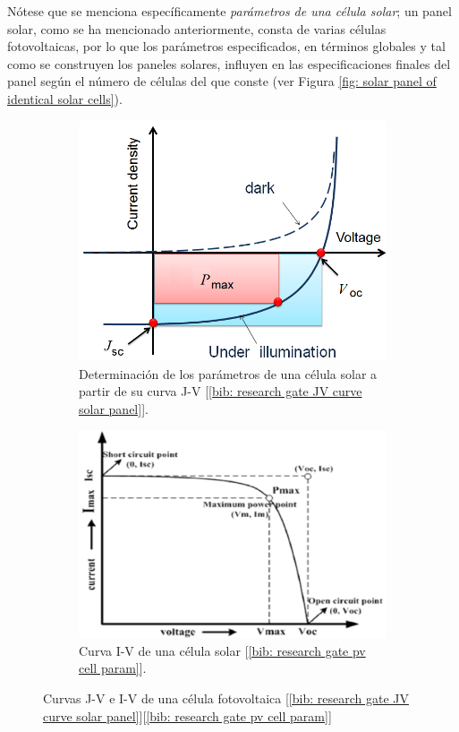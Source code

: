 \documentclass[12pt]{article}
\begin{document}
	\noindent Nótese que se menciona específicamente \textit{parámetros de una célula solar}; un panel solar, como se ha mencionado anteriormente, consta de varias células fotovoltaicas, por lo que los parámetros especificados, en términos globales y tal como se construyen los paneles solares, influyen en las especificaciones finales del panel según el número de células del que conste (ver Figura \ref{fig: solar panel of identical solar cells}). \\
		\begin{figure}[h]
		\begin{subfigure}{0.5\textwidth}
			\includegraphics[width=1\textwidth]{img/JV_curve_solarCell.png} 
			\caption{Determinación de los parámetros de una célula solar a partir de su curva J-V [\ref{bib: research gate JV curve solar panel}].}
			\label{fig: curva J-V célula solar}
		\end{subfigure}
		\begin{subfigure}{0.5\textwidth}
			\includegraphics[width=1\linewidth]{img/IV_curve_solarCell.png}
			\caption{Curva I-V de una célula solar [\ref{bib: research gate pv cell param}].}
			\label{fig: I-V curve of a solar cell}
		\end{subfigure}
		\caption{Curvas J-V e I-V de una célula fotovoltaica [\ref{bib: research gate JV curve solar panel}][\ref{bib: research gate pv cell param}]}
		\label{fig:curvas J-V e I-V célula PV}
	\end{figure}
\end{document}
